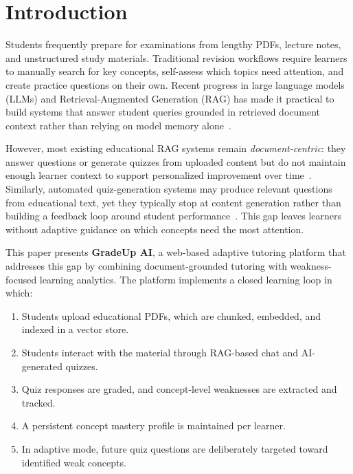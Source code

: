 \documentclass[runningheads]{llncs}
\begin{document}
\section{Introduction}

Students frequently prepare for examinations from lengthy PDFs, lecture notes, and unstructured study materials. Traditional revision workflows require learners to manually search for key concepts, self-assess which topics need attention, and create practice questions on their own. Recent progress in large language models (LLMs) and Retrieval-Augmented Generation (RAG) has made it practical to build systems that answer student queries grounded in retrieved document context rather than relying on model memory alone~\cite{lewis2020rag,levonian2023ragmath,swacha2025survey}.

However, most existing educational RAG systems remain \emph{document-centric}: they answer questions or generate quizzes from uploaded content but do not maintain enough learner context to support personalized improvement over time~\cite{nye2023dialog,han2024tutoringrag}. Similarly, automated quiz-generation systems may produce relevant questions from educational text, yet they typically stop at content generation rather than building a feedback loop around student performance~\cite{bhowmick2023qg,kurulkar2025quizrag}. This gap leaves learners without adaptive guidance on which concepts need the most attention.

This paper presents \textbf{GradeUp AI}, a web-based adaptive tutoring platform that addresses this gap by combining document-grounded tutoring with weakness-focused learning analytics. The platform implements a closed learning loop in which:
\begin{enumerate}
    \item Students upload educational PDFs, which are chunked, embedded, and indexed in a vector store.
    \item Students interact with the material through RAG-based chat and AI-generated quizzes.
    \item Quiz responses are graded, and concept-level weaknesses are extracted and tracked.
    \item A persistent concept mastery profile is maintained per learner.
    \item In adaptive mode, future quiz questions are deliberately targeted toward identified weak concepts.
\end{enumerate}
\end{document}

